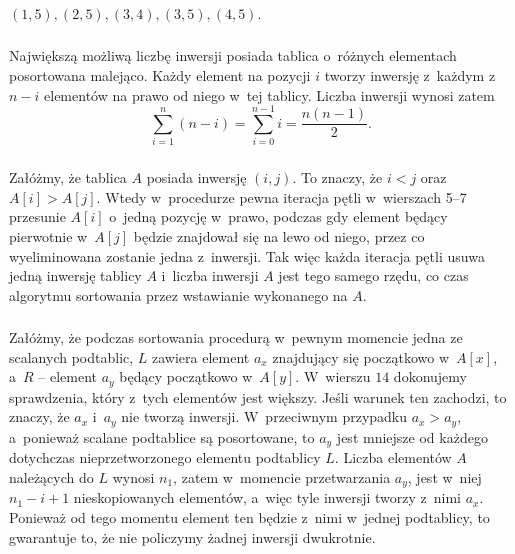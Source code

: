 \subsection{} %

\subsubsection{} %
$(1,5),(2,5),(3,4),(3,5),(4,5).$

\subsubsection{} %
Największą możliwą liczbę inwersji posiada tablica o~różnych elementach posortowana malejąco. Każdy element na pozycji $i$ tworzy inwersję z~każdym z~$n-i$ elementów na prawo od niego w~tej tablicy. Liczba inwersji wynosi zatem
\[
	\sum_{i=1}^n(n-i) = \sum_{i=0}^{n-1}i = \frac{n(n-1)}{2}.
\]

\subsubsection{} %
Załóżmy, że tablica $A$ posiada inwersję $(i,j)$. To znaczy, że $i<j$ oraz $A[i]>A[j]$. Wtedy w~procedurze  pewna iteracja pętli  w~wierszach 5--7 przesunie $A[i]$ o~jedną pozycję w~prawo, podczas gdy element będący pierwotnie w~$A[j]$ będzie znajdował się na lewo od niego, przez co wyeliminowana zostanie jedna z~inwersji. Tak więc każda iteracja pętli  usuwa jedną inwersję tablicy $A$ i~liczba inwersji $A$ jest tego samego rzędu, co czas algorytmu sortowania przez wstawianie wykonanego na $A$.

\subsubsection{} %
Załóżmy, że podczas sortowania procedurą  w~pewnym momencie jedna ze scalanych podtablic, $L$ zawiera element $a_x$ znajdujący się początkowo w~$A[x]$, a~$R$ -- element $a_y$ będący początkowo w~$A[y]$. W~wierszu $14$ dokonujemy sprawdzenia, który z~tych elementów jest większy. Jeśli warunek ten zachodzi, to znaczy, że $a_x$ i~$a_y$ nie tworzą inwersji. W~przeciwnym przypadku $a_x>a_y$, a~ponieważ scalane podtablice są posortowane, to $a_y$ jest mniejsze od każdego dotychczas nieprzetworzonego elementu podtablicy $L$. Liczba elementów $A$ należących do $L$ wynosi $n_1$, zatem w~momencie przetwarzania $a_y$, jest w~niej $n_1-i+1$ nieskopiowanych elementów, a~więc tyle inwersji tworzy z~nimi $a_x$. Ponieważ od tego momentu element ten będzie z~nimi w~jednej podtablicy, to gwarantuje to, że nie policzymy żadnej inwersji dwukrotnie.

